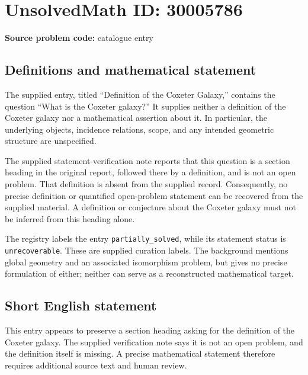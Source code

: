 \documentclass[11pt]{article}
\begin{document}
\section*{UnsolvedMath ID: 30005786}
\textbf{Source problem code:} catalogue entry
\subsection{Definitions and mathematical statement}
The supplied entry, titled ``Definition of the Coxeter Galaxy,'' contains the question ``What is the Coxeter galaxy?'' It supplies neither a definition of the Coxeter galaxy nor a mathematical assertion about it. In particular, the underlying objects, incidence relations, scope, and any intended geometric structure are unspecified.

The supplied statement-verification note reports that this question is a section heading in the original report, followed there by a definition, and is not an open problem. That definition is absent from the supplied record. Consequently, no precise definition or quantified open-problem statement can be recovered from the supplied material. A definition or conjecture about the Coxeter galaxy must not be inferred from this heading alone.

The registry labels the entry \texttt{partially\_solved}, while its statement status is \texttt{unrecoverable}. These are supplied curation labels. The background mentions global geometry and an associated isomorphism problem, but gives no precise formulation of either; neither can serve as a reconstructed mathematical target.
\subsection{Short English statement}
This entry appears to preserve a section heading asking for the definition of the Coxeter galaxy. The supplied verification note says it is not an open problem, and the definition itself is missing. A precise mathematical statement therefore requires additional source text and human review.
\end{document}
